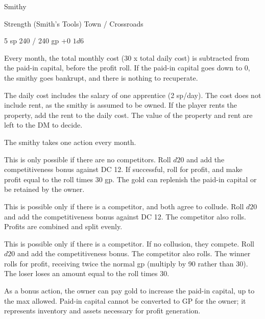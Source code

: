 \documentclass[twocolumn]{dndbook}
\begin{document}
\begin{DndMonster}[width=.5\textwidth - 8pt]{Smithy}

	\hfill Strength (Smith's Tools)
	\hfill Town / Crossroads

	\hfill 5 sp
	\hfill 240 / 240 gp
	\hfill +0
	\hfill $1d6$

	Every month, the total monthly cost (30 x total daily cost) is subtracted
	from the paid-in capital, before the profit roll.
	If the paid-in capital goes down to 0, the smithy goes bankrupt,
	and there is nothing to recuperate.\par

	The daily cost includes the salary of one apprentice (2 sp/day).
	The cost does not include rent, as the smithy is assumed to be owned.
	If the player rents the property, add the rent to the daily cost.
	The value of the property and rent are left to the DM to decide.\par

	The smithy takes one action every month.

	This is only possible if there are no competitors.
	Roll $d20$ and add the competitiveness bonus against DC 12.
	If successful, roll for profit, and make profit equal to the roll
	times 30 gp. The gold can replenish the paid-in capital or be retained by the owner.

	This is possible only if there is a competitor, and both agree to collude.
	Roll $d20$ and add the competitiveness bonus against DC 12.
	The competitor also rolls. Profits are combined and split evenly.

	This is possible only if there is a competitor. If no collusion, they compete.
	Roll $d20$ and add the competitiveness bonus.
	The competitor also rolls.
	The winner rolls for profit, receiving twice the normal gp (multiply by 90 rather than 30).
	The loser loses an amount equal to the roll times 30.

	As a bonus action, the owner can pay gold to increase
	the paid-in capital, up to the max allowed.
	Paid-in capital cannot be converted to GP for the owner; it represents inventory and assets necessary for profit generation.
\end{DndMonster}
\end{document}
